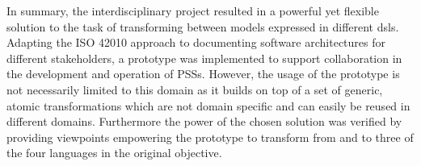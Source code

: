 In summary, the interdisciplinary project resulted in a powerful yet flexible solution to the task of transforming between models expressed in different \glspl{dsl}. Adapting the ISO 42010 approach \cite{ref:42010} to documenting software architectures for different stakeholders, a prototype was implemented to support collaboration in the development and operation of \glspl{PSS}. However, the usage of the prototype is not necessarily limited to this domain as it builds on top of a set of generic, atomic transformations which are not domain specific and can easily be reused in different domains. Furthermore the power of the chosen solution was verified by providing viewpoints empowering the prototype to transform from and to three of the four languages in the original objective.